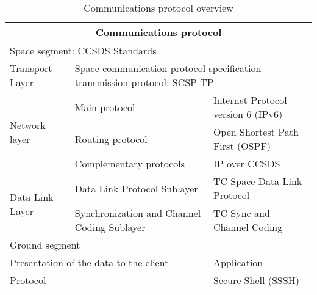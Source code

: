 \documentclass[12pt,a4paper]{report}
\author{Eva María Urbano González}
\begin{document}
\begin{table}
\begin{center}
\begin{tabular}{|l|l|l|}
\hline
\multicolumn{3}{|c|}{\textbf{Communications protocol}}\\
\hline
\multicolumn{3}{|l|}{Space segment: CCSDS Standards}\\
\hline
Transport Layer&\multicolumn{2}{|l|}{Space communication protocol specification transmission protocol: SCSP-TP}\\
\hline
\multirow{3}{*}{Network layer}&Main protocol&Internet Protocol version 6 (IPv6)\\
&Routing protocol&Open Shortest Path First (OSPF)\\
&Complementary protocols&IP over CCSDS\\
\hline
\multirow{2}{*}{Data Link Layer}&Data Link Protocol Sublayer&TC Space Data Link Protocol\\
&Synchronization and Channel Coding Sublayer&TC Sync and Channel Coding\\
\hline
\multicolumn{3}{|l|}{Ground segment}\\
\hline
\multicolumn{2}{|l|}{Presentation of the data to the client}&Application\\
\hline
\multicolumn{2}{|l|}{Protocol}&Secure Shell (SSSH)\\
\hline
\end{tabular}
\caption{Communications protocol overview}
\end{center}
\end{table}
\end{document}
